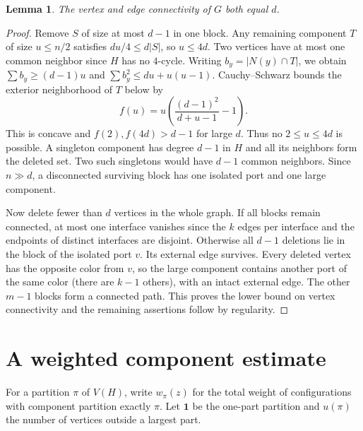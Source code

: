 \documentclass[11pt]{article}
\newtheorem{lemma}[theorem]{Lemma}
\newcommand{\one}{\boldsymbol{1}}
\begin{document}
\begin{lemma}The vertex and edge connectivity of $G$ both equal $d$.\end{lemma}
\begin{proof}
Remove $S$ of size at most $d-1$ in one block. Any remaining component $T$ of size $u\le n/2$ satisfies $du/4\le d|S|$, so $u\le4d$. Two vertices have at most one common neighbor since $H$ has no $4$-cycle. Writing $b_y=|N(y)\cap T|$, we obtain $\sum b_y\ge(d-1)u$ and $\sum b_y^2\le du+u(u-1)$. Cauchy--Schwarz bounds the exterior neighborhood of $T$ below by
\[
 f(u)=u\left(\frac{(d-1)^2}{d+u-1}-1\right).
\]
This is concave and $f(2),f(4d)>d-1$ for large $d$. Thus no $2\le u\le4d$ is possible. A singleton component has degree $d-1$ in $H$ and all its neighbors form the deleted set. Two such singletons would have $d-1$ common neighbors. Since $n\gg d$, a disconnected surviving block has one isolated port and one large component.

Now delete fewer than $d$ vertices in the whole graph. If all blocks remain connected, at most one interface vanishes since the $k$ edges per interface and the endpoints of distinct interfaces are disjoint. Otherwise all $d-1$ deletions lie in the block of the isolated port $v$. Its external edge survives. Every deleted vertex has the opposite color from $v$, so the large component contains another port of the same color (there are $k-1$ others), with an intact external edge. The other $m-1$ blocks form a connected path. This proves the lower bound on vertex connectivity and the remaining assertions follow by regularity.
\end{proof}

\section{A weighted component estimate}
For a partition $\pi$ of $V(H)$, write $w_\pi(z)$ for the total weight of configurations with component partition exactly $\pi$. Let $\one$ be the one-part partition and $u(\pi)$ the number of vertices outside a largest part.
\end{document}

